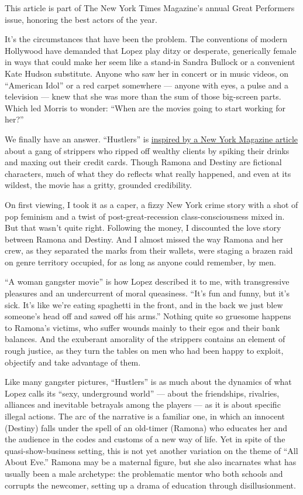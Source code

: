 \href{https://www.nytimes3xbfgragh.onion/interactive/2019/12/09/magazine/best-actors.html}{}

This article is part of The New York Times Magazine's annual Great
Performers issue, honoring the best actors of the year.

It's the circumstances that have been the problem. The conventions of
modern Hollywood have demanded that Lopez play ditzy or desperate,
generically female in ways that could make her seem like a stand-in
Sandra Bullock or a convenient Kate Hudson substitute. Anyone who saw
her in concert or in music videos, on ``American Idol'' or a red carpet
somewhere --- anyone with eyes, a pulse and a television --- knew that
she was more than the sum of those big-screen parts. Which led Morris to
wonder: ``When are the movies going to start working for her?''

We finally have an answer. ``Hustlers'' is
\href{https://www.thecut.com/2015/12/robin-hood-strippers-scores-c-v-r.html}{inspired
by a New York Magazine article} about a gang of strippers who ripped off
wealthy clients by spiking their drinks and maxing out their credit
cards. Though Ramona and Destiny are fictional characters, much of what
they do reflects what really happened, and even at its wildest, the
movie has a gritty, grounded credibility.

On first viewing, I took it as a caper, a fizzy New York crime story
with a shot of pop feminism and a twist of post-great-recession
class-consciousness mixed in. But that wasn't quite right. Following the
money, I discounted the love story between Ramona and Destiny. And I
almost missed the way Ramona and her crew, as they separated the marks
from their wallets, were staging a brazen raid on genre territory
occupied, for as long as anyone could remember, by men.

``A woman gangster movie'' is how Lopez described it to me, with
transgressive pleasures and an undercurrent of moral queasiness. ``It's
fun and funny, but it's sick. It's like we're eating spaghetti in the
front, and in the back we just blew someone's head off and sawed off his
arms.'' Nothing quite so gruesome happens to Ramona's victims, who
suffer wounds mainly to their egos and their bank balances. And the
exuberant amorality of the strippers contains an element of rough
justice, as they turn the tables on men who had been happy to exploit,
objectify and take advantage of them.

Like many gangster pictures, ``Hustlers'' is as much about the dynamics
of what Lopez calls its ``sexy, underground world'' --- about the
friendships, rivalries, alliances and inevitable betrayals among the
players --- as it is about specific illegal actions. The arc of the
narrative is a familiar one, in which an innocent (Destiny) falls under
the spell of an old-timer (Ramona) who educates her and the audience in
the codes and customs of a new way of life. Yet in spite of the
quasi-show-business setting, this is not yet another variation on the
theme of ``All About Eve.'' Ramona may be a maternal figure, but she
also incarnates what has usually been a male archetype: the problematic
mentor who both schools and corrupts the newcomer, setting up a drama of
education through disillusionment.

